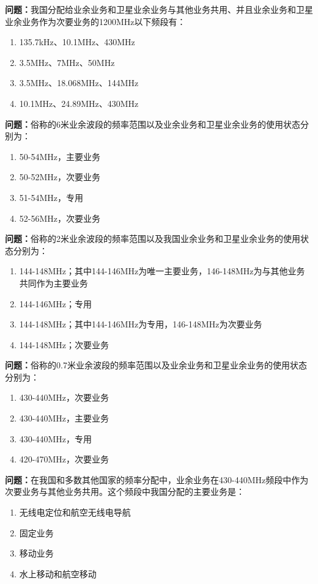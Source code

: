 \documentclass{ctexbook}%
\begin{document}
\textbf{问题：}我国分配给业余业务和卫星业余业务与其他业务共用、并且业余业务和卫星业余业务作为次要业务的1200MHz以下频段有：
\begin{enumerate}[label=\Alph*), leftmargin=3em]
\item 135.7kHz、10.1MHz、430MHz
\item 3.5MHz、7MHz、50MHz
\item 3.5MHz、18.068MHz、144MHz
\item 10.1MHz、24.89MHz、430MHz
\end{enumerate}

\textbf{问题：}俗称的6米业余波段的频率范围以及业余业务和卫星业余业务的使用状态分别为：
\begin{enumerate}[label=\Alph*), leftmargin=3em]
\item 50-54MHz，主要业务
\item 50-52MHz，次要业务
\item 51-54MHz，专用
\item 52-56MHz，次要业务
\end{enumerate}

\textbf{问题：}俗称的2米业余波段的频率范围以及我国业余业务和卫星业余业务的使用状态分别为：
\begin{enumerate}[label=\Alph*), leftmargin=3em]
\item 144-148MHz；其中144-146MHz为唯一主要业务，146-148MHz为与其他业务共同作为主要业务
\item 144-146MHz；专用
\item 144-148MHz；其中144-146MHz为专用，146-148MHz为次要业务
\item 144-148MHz；次要业务
\end{enumerate}

\textbf{问题：}俗称的0.7米业余波段的频率范围以及业余业务和卫星业余业务的使用状态分别为：
\begin{enumerate}[label=\Alph*), leftmargin=3em]
\item 430-440MHz，次要业务
\item 430-440MHz，主要业务
\item 430-440MHz，专用
\item 420-470MHz，次要业务
\end{enumerate}

\textbf{问题：}在我国和多数其他国家的频率分配中，业余业务在430-440MHz频段中作为次要业务与其他业务共用。这个频段中我国分配的主要业务是：
\begin{enumerate}[label=\Alph*), leftmargin=3em]
\item 无线电定位和航空无线电导航
\item 固定业务
\item 移动业务
\item 水上移动和航空移动
\end{enumerate}
\end{document}
